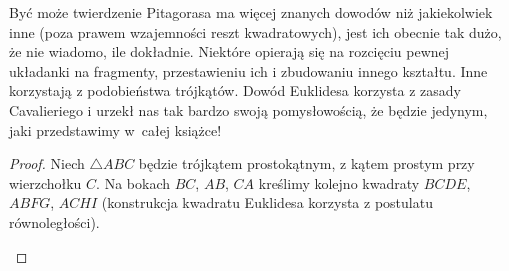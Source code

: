 Być może twierdzenie Pitagorasa ma więcej znanych dowodów niż jakiekolwiek inne (poza prawem wzajemności reszt kwadratowych), jest ich obecnie tak dużo, że nie wiadomo, ile dokładnie.
Niektóre opierają się na rozcięciu pewnej układanki na fragmenty, przestawieniu ich i zbudowaniu innego kształtu.
Inne korzystają z podobieństwa trójkątów.
Dowód Euklidesa korzysta z zasady Cavalieriego i urzekł nas tak bardzo swoją pomysłowością, że będzie jedynym, jaki przedstawimy w~całej książce!

\begin{proof}
    Niech $\triangle ABC$ będzie trójkątem prostokątnym, z kątem prostym przy wierzchołku $C$.
    Na bokach $BC$, $AB$, $CA$ kreślimy kolejno kwadraty $BCDE$, $ABFG$, $ACHI$ (konstrukcja kwadratu Euklidesa korzysta z postulatu równoległości).

    \begin{center}
\begin{comment}
            \begin{tikzpicture}[scale=.4]
        \tkzDefPoint(105:3){A}
        \tkzDefPoint(285:3){B}
        \tkzDefPoint(35:3){C}
        \tkzDefPoint(35:4.75){CC}

        \tkzLabelPoint[above left](A){$A$}
        \tkzLabelPoint[below](B){$B$}
        \tkzLabelPoint[below left](CC){$C$}
        \tkzDefSquare(B,A)
        \tkzGetPoints{G}{F}
        \tkzLabelPoint[below](F){$F$}
        \tkzLabelPoint[above](G){$G$}
        \tkzDefPointsBy[projection=onto A--B](C){K}
        \tkzDefPointsBy[projection=onto G--F](C){L}

        \tkzDrawPolygon[line width=0.3mm, fill=blue!10](A,K,L,G)
        \tkzDrawPolygon[line width=0.3mm, fill=red!10](B,K,L,F)
        \tkzDrawPolygon[line width=0.3mm](A,B,F,G)
        \tkzLabelPoint[below left](K){$K$}
        \tkzLabelPoint[left](L){$L$}



\end{comment}
\end{center}
\end{proof}
